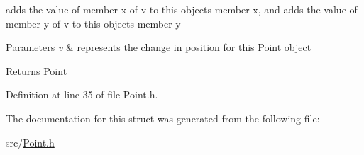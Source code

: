 adds the value of member x of v to this objects member x, and adds the value of member y of v to this objects member y 


\begin{DoxyParams}{Parameters}
{\em v} & represents the change in position for this \mbox{\hyperlink{struct_point}{Point}} object \\
\hline
\end{DoxyParams}
\begin{DoxyReturn}{Returns}
\mbox{\hyperlink{struct_point}{Point}} 
\end{DoxyReturn}


Definition at line 35 of file Point.\+h.


\begin{DoxyCode}{0}

\end{DoxyCode}


The documentation for this struct was generated from the following file\+:\begin{DoxyCompactItemize}
\item 
src/\mbox{\hyperlink{_point_8h}{Point.\+h}}\end{DoxyCompactItemize}
